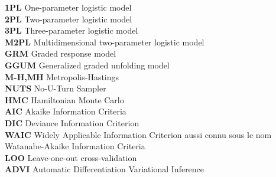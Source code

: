\textbf{1PL}\hspace{0.5cm}  One-parameter logistic model\\
\textbf{2PL}\hspace{0.5cm}  Two-parameter logistic model\\
\textbf{3PL}\hspace{0.5cm}  Three-parameter logistic model\\
\textbf{M2PL}\hspace{0.5cm}  Multidimensional two-parameter logistic model\\
\textbf{GRM}\hspace{0.5cm}  Graded response model\\
\textbf{GGUM}\hspace{0.5cm}  Generalized graded unfolding model\\
\textbf{M-H,MH }\hspace{0.5cm}  Metropolis-Hastings\\
\textbf{NUTS}\hspace{0.5cm}  No-U-Turn Sampler\\
\textbf{HMC}\hspace{0.5cm}  Hamiltonian Monte Carlo\\
\textbf{AIC}\hspace{0.5cm} Akaike Information Criteria\\
\textbf{DIC}\hspace{0.5cm} Deviance Information Criterion\\
\textbf{WAIC}\hspace{0.5cm} Widely Applicable Information Criterion aussi connu sous le nom Watanabe-Akaike Information Criteria\\
\textbf{LOO}\hspace{0.5cm}  Leave-one-out cross-validation\\
\textbf{ADVI}\hspace{0.5cm}  Automatic Differentiation Variational Inference\\
















